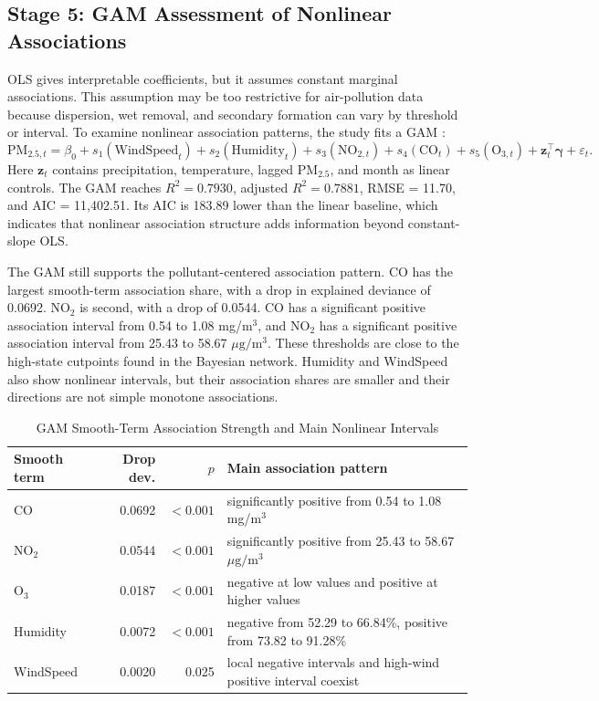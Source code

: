 \documentclass[11pt]{article}
\begin{document}
\subsection{Stage 5: GAM Assessment of Nonlinear Associations}

OLS gives interpretable coefficients, but it assumes constant marginal associations. This assumption may be too restrictive for air-pollution data because dispersion, wet removal, and secondary formation can vary by threshold or interval. To examine nonlinear association patterns, the study fits a GAM \cite{hastie1990,wood2017}:
\begin{equation}
\mathrm{PM}_{2.5,t}=\beta_0+s_1(\mathrm{WindSpeed}_t)+s_2(\mathrm{Humidity}_t)+s_3(\mathrm{NO}_{2,t})+s_4(\mathrm{CO}_t)+s_5(\mathrm{O}_{3,t})+\mathbf{z}_t^\top\boldsymbol\gamma+\varepsilon_t .
\end{equation}
Here $\mathbf{z}_t$ contains precipitation, temperature, lagged PM$_{2.5}$, and month as linear controls. The GAM reaches $R^2=0.7930$, adjusted $R^2=0.7881$, RMSE = 11.70, and AIC = 11,402.51. Its AIC is 183.89 lower than the linear baseline, which indicates that nonlinear association structure adds information beyond constant-slope OLS.

The GAM still supports the pollutant-centered association pattern. CO has the largest smooth-term association share, with a drop in explained deviance of 0.0692. NO$_2$ is second, with a drop of 0.0544. CO has a significant positive association interval from 0.54 to 1.08 mg/m$^3$, and NO$_2$ has a significant positive association interval from 25.43 to 58.67 $\mu\mathrm{g}/\mathrm{m}^3$. These thresholds are close to the high-state cutpoints found in the Bayesian network. Humidity and WindSpeed also show nonlinear intervals, but their association shares are smaller and their directions are not simple monotone associations.

\begin{table}[!htbp]
\centering
\caption{GAM Smooth-Term Association Strength and Main Nonlinear Intervals}
\label{tab:gam}
\small
\begin{tabularx}{\textwidth}{lrrY}
\toprule
Smooth term & Drop dev. & $p$ & Main association pattern \\
\midrule
CO & 0.0692 & $<0.001$ & significantly positive from 0.54 to 1.08 mg/m$^3$ \\
NO$_2$ & 0.0544 & $<0.001$ & significantly positive from 25.43 to 58.67 $\mu\mathrm{g}/\mathrm{m}^3$ \\
O$_3$ & 0.0187 & $<0.001$ & negative at low values and positive at higher values \\
Humidity & 0.0072 & $<0.001$ & negative from 52.29 to 66.84\%, positive from 73.82 to 91.28\% \\
WindSpeed & 0.0020 & 0.025 & local negative intervals and high-wind positive interval coexist \\
\bottomrule
\end{tabularx}
\end{table}
\end{document}
